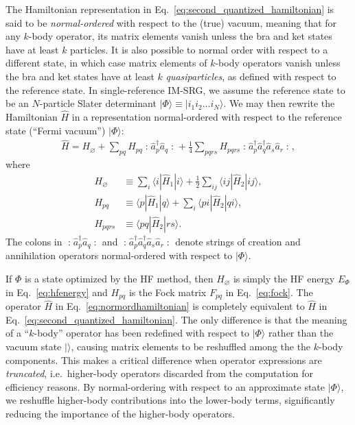 \documentclass[aip, jcp, 12pt]{revtex4-1}
\newcommand{\ket}[1]{| #1 \rangle}
\newcommand{\normord}[1]{\mathopen: #1 \mathclose:}
\begin{document}
The Hamiltonian representation in Eq.\ \eqref{eq:second_quantized_hamiltonian} is said to be \textit{normal-ordered}\cite{shavitt2009many} with respect to the (true) vacuum, meaning that for any $k$-body operator, its matrix elements vanish unless the bra and ket states have at least $k$ particles.  It is also possible to normal order with respect to a different state, in which case matrix elements of $k$-body operators vanish unless the bra and ket states have at least $k$ \emph{quasiparticles}, as defined with respect to the reference state.  In single-reference IM-SRG, we assume the reference state to be an $N$-particle Slater determinant $\ket{\Phi} \equiv \ket{i_1 i_2 \ldots i_N}$.  We may then rewrite the Hamiltonian $\hat H$ in a representation normal-ordered with respect to the reference state (``Fermi vacuum'') $\ket{\Phi}$:
\begin{align}
  \hat{H} = H_\varnothing + \sum_{p q} H_{p q} \normord{\hat{a}_p^\dagger \hat{a}_q^{}} + \frac{1}{4} \sum_{p q r s} H_{p q r s} \normord{\hat{a}_p^\dagger \hat{a}_q^\dagger \hat{a}_s^{} \hat{a}_r^{}},
  \label{eq:normordhamiltonian}
\end{align}
where
\begin{align*}
  H_\varnothing &\equiv \sum_i \langle i | \hat{H}_1 | i \rangle + \frac{1}{2} \sum_{i j} \langle i j | \hat{H}_2 | i j \rangle, \\
  H_{p q} &\equiv \langle p | \hat{H}_1 | q \rangle + \sum_i \langle p i | \hat{H}_2 | q i \rangle, \\
  H_{p q r s} &\equiv \langle p q | \hat{H}_2 | r s \rangle.
\end{align*}
The colons in $\normord{\hat{a}_p^\dagger \hat{a}_q^{}}$ and $\normord{\hat{a}_p^\dagger \hat{a}_q^\dagger \hat{a}_s^{} \hat{a}_r^{}}$ denote strings of creation and annihilation operators normal-ordered with respect to $\ket{\Phi}$.

If $\Phi$ is a state optimized by the HF method, then $H_\varnothing$ is simply the HF energy $E_\Phi$ in Eq.\ \eqref{eq:hfenergy} and $H_{p q}$ is the Fock matrix $F_{p q}$ in Eq.\ \eqref{eq:fock}.  The operator $\hat H$ in Eq.\ \eqref{eq:normordhamiltonian} is completely equivalent to $\hat H$ in Eq.\ \eqref{eq:second_quantized_hamiltonian}.  The only difference is that the meaning of a ``$k$-body'' operator has been redefined with respect to $\ket{\Phi}$ rather than the vacuum state $\ket{}$, causing matrix elements to be reshuffled among the the $k$-body components.  This makes a critical difference when operator expressions are \emph{truncated}, i.e.\ higher-body operators discarded from the computation for efficiency reasons.  By normal-ordering with respect to an approximate state $\ket{\Phi}$, we reshuffle higher-body contributions into the lower-body terms, significantly reducing the importance of the higher-body operators.
\end{document}
